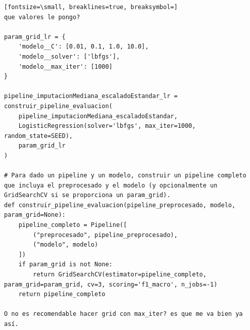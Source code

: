 \documentclass[12pt,a4paper,oneside]{book}
\begin{document}
\begin{iaprompt}
\begin{Verbatim}[fontsize=\small, breaklines=true, breaksymbol=]
que valores le pongo?

param_grid_lr = {
    'modelo__C': [0.01, 0.1, 1.0, 10.0],
    'modelo__solver': ['lbfgs'],
    'modelo__max_iter': [1000]
}

pipeline_imputacionMediana_escaladoEstandar_lr = construir_pipeline_evaluacion(
    pipeline_imputacionMediana_escaladoEstandar,
    LogisticRegression(solver='lbfgs', max_iter=1000, random_state=SEED),
    param_grid_lr
)

# Para dado un pipeline y un modelo, construir un pipeline completo que incluya el preprocesado y el modelo (y opcionalmente un GridSearchCV si se proporciona un param_grid).
def construir_pipeline_evaluacion(pipeline_preprocesado, modelo, param_grid=None):
    pipeline_completo = Pipeline([
        ("preprocesado", pipeline_preprocesado),
        ("modelo", modelo)
    ])
    if param_grid is not None:
        return GridSearchCV(estimator=pipeline_completo, param_grid=param_grid, cv=3, scoring='f1_macro', n_jobs=-1)
    return pipeline_completo

O no es recomendable hacer grid con max_iter? es que me va bien ya así.
\end{Verbatim}
\end{iaprompt}
\end{document}
